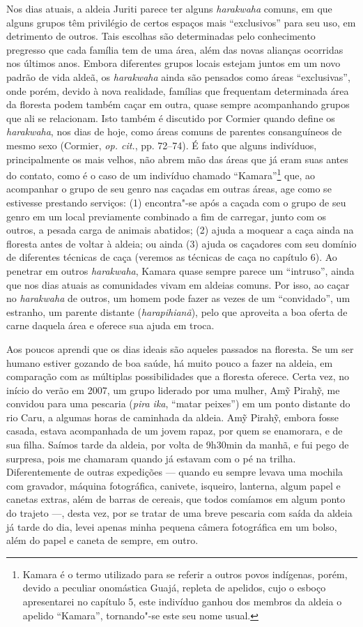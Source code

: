 Nos dias atuais, a aldeia Juriti parece ter alguns \emph{harakwaha}
comuns, em que alguns grupos têm privilégio de certos espaços mais
``exclusivos'' para seu uso, em detrimento de outros. Tais escolhas são
determinadas pelo conhecimento pregresso que cada família tem de uma
área, além das novas alianças ocorridas nos últimos anos. Embora
diferentes grupos locais estejam juntos em um novo padrão de vida aldeã,
os \emph{harakwaha} ainda são pensados como áreas ``exclusivas'', onde
porém, devido à nova realidade, famílias que frequentam determinada área
da floresta podem também caçar em outra, quase sempre acompanhando
grupos que ali se relacionam. Isto também é discutido por Cormier quando
define os \emph{harakwaha}, nos dias de hoje, como áreas comuns de
parentes consanguíneos de mesmo sexo (Cormier, \emph{op. cit.}, pp. 72--74). É fato
que alguns indivíduos, principalmente os mais velhos, não abrem mão das
áreas que já eram suas antes do contato, como é o caso de um indivíduo
chamado ``Kamara''\footnote{Kamara é o termo utilizado para se referir a
  outros povos indígenas, porém, devido a peculiar onomástica Guajá,
  repleta de apelidos, cujo o esboço apresentarei no capítulo 5, este
  indivíduo ganhou dos membros da aldeia o apelido ``Kamara'', tornando"-se
  este seu nome usual.} que, ao acompanhar o grupo de seu genro nas
caçadas em outras áreas, age como se estivesse prestando serviços: (1)
encontra"-se após a caçada com o grupo de seu genro em um local
previamente combinado a fim de carregar, junto com os outros, a pesada
carga de animais abatidos; (2) ajuda a moquear a caça ainda na floresta
antes de voltar à aldeia; ou ainda (3) ajuda os caçadores com seu
domínio de diferentes técnicas de caça (veremos as técnicas de caça no
capítulo 6). Ao penetrar em outros \emph{harakwaha}, Kamara quase sempre
parece um ``intruso'', ainda que nos dias atuais as comunidades vivam em
aldeias comuns. Por isso, ao caçar no \emph{harakwaha} de outros, um
homem pode fazer as vezes de um ``convidado'', um estranho, um parente
distante (\emph{harapihianã}), pelo que aproveita a boa oferta de carne
daquela área e oferece sua ajuda em troca.

Aos poucos aprendi que os dias ideais são aqueles passados na floresta.
Se um ser humano estiver gozando de boa saúde, há muito pouco a fazer na
aldeia, em comparação com as múltiplas possibilidades que a floresta
oferece. Certa vez, no início do verão em 2007, um grupo liderado por
uma mulher, Amỹ Pirahỹ, me convidou para uma pescaria (\emph{pira ika},
``matar peixes'') em um ponto distante do rio Caru, a algumas horas de
caminhada da aldeia. Amỹ Pirahỹ, embora fosse casada, estava acompanhada
de um jovem rapaz, por quem se enamorara, e de sua filha. Saímos tarde
da aldeia, por volta de 9h30min da manhã, e fui pego de surpresa, pois
me chamaram quando já estavam com o pé na trilha. Diferentemente de
outras expedições --- quando eu sempre levava uma mochila com gravador,
máquina fotográfica, canivete, isqueiro, lanterna, algum papel e canetas
extras, além de barras de cereais, que todos comíamos em algum ponto do
trajeto ---, desta vez, por se tratar de uma breve pescaria com saída da
aldeia já tarde do dia, levei apenas minha pequena câmera fotográfica em
um bolso, além do papel e caneta de sempre, em outro.

